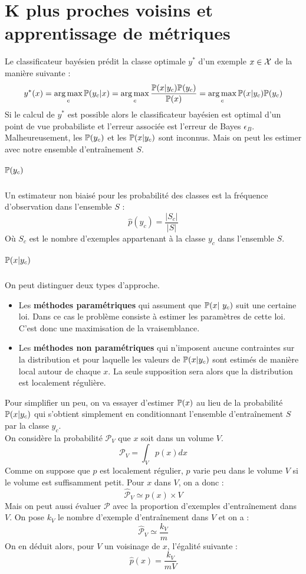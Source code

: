 \chapter{K plus proches voisins et apprentissage de métriques}

\myminitoc


Le classificateur bayésien prédit la classe optimale $y^*$ d'un exemple $x \in \mathcal{X}$ de la manière suivante :
$$ y^*(x) = \operatorname*{arg\,max}_c \mathbb{P}(y_c | x) = \operatorname*{arg\,max}_c \dfrac{\mathbb{P}(x | y_c) \mathbb{P}(y_c)}{\mathbb{P}(x)} = \operatorname*{arg\,max}_c \mathbb{P}(x | y_c) \mathbb{P}(y_c) $$
Si le calcul de $y^*$ est possible alors le classificateur bayésien est optimal d'un point de vue probabiliste et l'erreur associée est l'erreur de Bayes $\epsilon_B$. \\
Malheureusement, les $\mathbb{P}(y_c)$ et les $\mathbb{P}(x | y_c)$ sont inconnus. Mais on peut les estimer avec notre ensemble d'entraînement $S$.

\paragraph{\boldmath $\mathbb{P}(y_c)$}
Un estimateur non biaisé pour les probabilité des classes est la fréquence d'observation dans l'ensemble $S$ :
$$ \hat{p}(y_c) = \dfrac{|S_c|}{|S|} $$
Où $S_c$ est le nombre d'exemples appartenant à la classe $y_c$ dans l'ensemble $S$.

\paragraph{\boldmath $\mathbb{P}(x | y_c)$}
On peut distinguer deux types d'approche.
\begin{itemize}
	\item Les \textbf{méthodes paramétriques} qui assument que $\mathbb{P}(x | \ y_c)$ suit une certaine loi. Dans ce cas le problème consiste à estimer les paramètres de cette loi. C'est donc une maximisation de la vraisemblance.
	\item Les \textbf{méthodes non paramétriques} qui n'imposent aucune contraintes sur la distribution et pour laquelle les valeurs de $\mathbb{P}(x | y_c)$ sont estimés de manière local autour de chaque $x$. La seule supposition sera alors que la distribution est localement régulière.
\end{itemize}

Pour simplifier un peu, on va essayer d'estimer $\mathbb{P}(x)$ au lieu de la probabilité $\mathbb{P}(x | y_c)$ qui s'obtient simplement en conditionnant l'ensemble d'entraînement $S$ par la classe $y_c$. \\
On considère la probabilité $\mathcal{P}_V$ que $x$ soit dans un volume $V$.
$$ \mathcal{P}_V = \int_V p(x)dx $$
Comme on suppose que $p$ est localement régulier, $p$ varie peu dans le volume $V$ si le volume est suffisamment petit. Pour $x$ dans $V$, on a donc :
$$ \hat{\mathcal{P}}_V \simeq p(x) \times V $$
Mais on peut aussi évaluer $\mathcal{P}$ avec la proportion d'exemples d'entraînement dans $V$. On pose $k_V$ le nombre d'exemple d'entraînement dans $V$ et on a :
$$ \hat{\mathcal{P}}_V \simeq \dfrac{k_V}{m} $$
On en déduit alors, pour $V$ un voisinage de $x$, l'égalité suivante :
$$ \hat{p}(x) = \dfrac{k_V}{m V} $$

